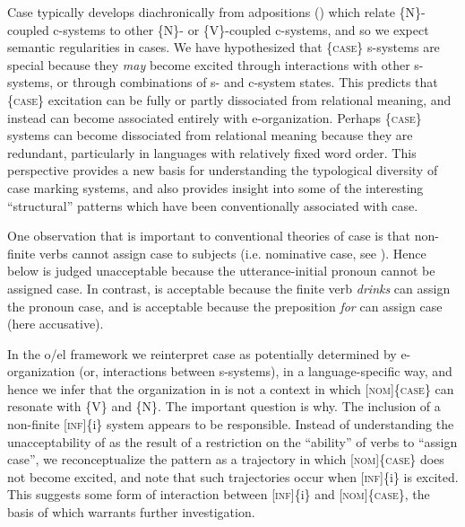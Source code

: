   Case typically develops diachronically from adpositions (\citealt{Heine2009,TraugottHeine1991}) which relate \{N\}-coupled c-systems to other \{N\}- or \{V\}-coupled c-systems, and so we expect semantic regularities in cases. We have hypothesized that \{\textsc{case}\} s-systems are special because they \textit{may} become excited through interactions with other s-systems, or through combinations of s- and c-system states. This predicts that \{\textsc{case}\} excitation can be fully or partly dissociated from relational meaning, and instead can become associated entirely with e-organization. Perhaps \{\textsc{case}\} systems can become dissociated from relational meaning because they are redundant, particularly in languages with relatively fixed word order. This perspective provides a new basis for understanding the typological diversity of case marking systems, and also provides insight into some of the interesting “structural” patterns which have been conventionally associated with case. 

  One observation that is important to conventional theories of case is that non-finite verbs cannot assign case to subjects (i.e. nominative case, see \citealt{Chomsky1980,ChomskyLasnik1977,Vergnaud2006}). Hence  below is judged unacceptable because the utterance-initial pronoun cannot be assigned case. In contrast,  is acceptable because the finite verb \textit{drinks} can assign the pronoun case, and  is acceptable because the preposition \textit{for} can assign case (here accusative).

\ea\label{ex:4:1}


\z
\z

  In the o/el framework we reinterpret case as potentially determined by e-organization (or, interactions between s-systems), in a language-specific way, and hence we infer that the organization in  is not a context in which [\textsc{nom}]\{\textsc{case}\} can resonate with \{V\} and \{N\}. The important question is why. The inclusion of a non-finite [\textsc{inf}]\{i\} system appears to be responsible. Instead of understanding the unacceptability of  as the result of a restriction on the “ability” of verbs to “assign case”, we reconceptualize the pattern as a trajectory in which [\textsc{nom}]\{\textsc{case}\} does not become excited, and note that such trajectories occur when [\textsc{inf}]\{i\} is excited. This suggests some form of interaction between [\textsc{inf}]\{i\} and [\textsc{nom}]\{\textsc{case}\}, the basis of which warrants further investigation.


